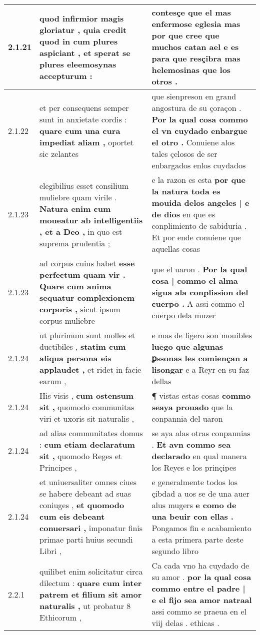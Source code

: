 \begin{tabular}{|p{1cm}|p{6.5cm}|p{6.5cm}|}
2.1.21 & quod infirmior magis gloriatur , \textbf{ quia credit quod in cum plures aspiciant , } et sperat se plures eleemosynas accepturum : & contesçe que el mas enfermose eglesia \textbf{ mas por que cree que muchos catan ael } e es para que resçibra mas helemosinas que los otros . \\\hline
2.1.22 & et per consequens semper sunt in anxietate cordis : \textbf{ quare cum una cura impediat aliam , } oportet sic zelantes & que sienpreson en grand angostura de su çoraçon . \textbf{ Por la qual cosa commo el vn cuydado enbargue el otro . } Conuiene alos tales çelosos de ser enbargados enlos cuydados \\\hline
2.1.23 & elegibilius esset consilium muliebre quam virile . \textbf{ Natura enim cum moueatur ab intelligentiis , et a Deo , } in quo est suprema prudentia ; & e la razon es esta \textbf{ por que la natura toda es mouida delos angeles | e de dios } en que es conplimiento de sabiduria . Et por ende conuiene que aquellas cosas \\\hline
2.1.23 & ad corpus cuius habet \textbf{ esse perfectum quam vir . Quare cum anima sequatur complexionem corporis , } sicut ipsum corpus muliebre & que el uaron . \textbf{ Por la qual cosa | commo el alma sigua ala conplission del cuerpo . } A assi commo el cuerpo dela muzer \\\hline
2.1.24 & ut plurimum sunt molles et ductibiles , \textbf{ statim cum aliqua persona eis applaudet , } et ridet in facie earum , & e mas de ligero son mouibles \textbf{ luego que algunas ꝑssonas les comiençan a lisongar } e a Reyr en su faz dellas \\\hline
2.1.24 & His visis , \textbf{ cum ostensum sit , } quomodo communitas viri et uxoris sit naturalis , & ¶ vistas estas cosas \textbf{ commo seaya prouado } que la conpannia del uaron \\\hline
2.1.24 & ad alias communitates domus : \textbf{ cum etiam declaratum sit , } quomodo Reges et Principes , & se aya alas otras conpannias . \textbf{ Et avn commo sea declarado } en qual manera los Reyes e los prinçipes \\\hline
2.1.24 & et uniuersaliter omnes ciues se habere debeant ad suas coniuges , \textbf{ et quomodo cum eis debeant conuersari , } imponatur finis primae parti huius secundi Libri , & e generalmente todos los çibdad a uos se de una auer alus mugers \textbf{ e como de una beuir con ellas . } Pongamos fin e acabamiento a esta primera parte deste segundo libro \\\hline
2.2.1 & quilibet enim solicitatur circa dilectum : \textbf{ quare cum inter patrem et filium sit amor naturalis , } ut probatur 8 Ethicorum , & Ca cada vno ha cuydado de su amor . \textbf{ por la qual cosa commo entre el padre | e el fijo sea amor natraal } assi commo se praeua en el viij delas . ethicas . \\\hline

\end{tabular}
